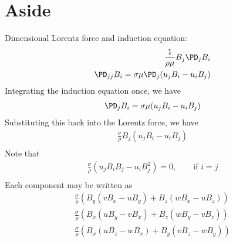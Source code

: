 \documentclass[11pt]{article}
\begin{document}
\newpage
\section{Aside}
Dimensional Lorentz force and induction equation:
\begin{equation}\begin{aligned}
\frac{1}{\rho \mu} B_j \PD_j B_i \\
\PD_{jj} B_i = \sigma \mu \PD_j (u_j B_i - u_i B_j)
\end{aligned}\end{equation}
Integrating the induction equation once, we have
\begin{equation}\begin{aligned}
\PD_{j} B_i = \sigma \mu (u_j B_i - u_i B_j)
\end{aligned}\end{equation}
Substituting this back into the Lorentz force, we have
\begin{equation}\begin{aligned}
\frac{\sigma}{\rho} B_j (u_j B_i - u_i B_j) \\
\end{aligned}\end{equation}
Note that
\begin{equation}\begin{aligned}
\frac{\sigma}{\rho} (u_j B_i B_j - u_i B_j^2) = 0 , \qquad \text{if $i = j$} \\
\end{aligned}\end{equation}
Each component may be written as
\begin{equation}\begin{aligned}
\frac{\sigma}{\rho} (B_y (v B_x - u B_y) + B_z (w B_x - u B_z)) \\
\frac{\sigma}{\rho} (B_x (u B_y - v B_x) + B_z (w B_y - v B_z)) \\
\frac{\sigma}{\rho} (B_x (u B_z - w B_x) + B_y (v B_z - w B_y)) \\
\end{aligned}\end{equation}
\end{document}
